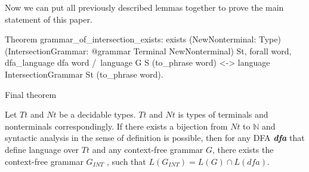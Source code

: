 Now we can put all previously described lemmas together to prove the main statement of this paper.

\begin{listing}[h]
   \begin{pyglist}[language=coq, numbers=none, numbersep=5pt]

Theorem grammar_of_intersection_exists:
 exists
  (NewNonterminal: Type)
  (IntersectionGrammar: @grammar Terminal NewNonterminal) St,
 forall word,
   dfa_language dfa word /\ language G S (to_phrase word) <->
   language IntersectionGrammar St (to_phrase word).
  \end{pyglist}
\caption{Final theorem}
\label{lst:lang-eq}
\end{listing}

\begin{theorem}
    Let $Tt$ and $Nt$ be a decidable types. $Tt$ and $Nt$ is types of terminals and nonterminals correspondingly.
    If there exists a bijection from $Nt$ to $\mathbb{N}$ and syntactic analysis in the sense of definition is possible, then for any DFA \textbf{\textit{dfa}} that define language over $Tt$ and any context-free grammar $G$, there exists the context-free grammar $G_{INT}$ , such that $L(G_{INT}) = L(G) \cap L(\textit{dfa})$.
\end{theorem}

